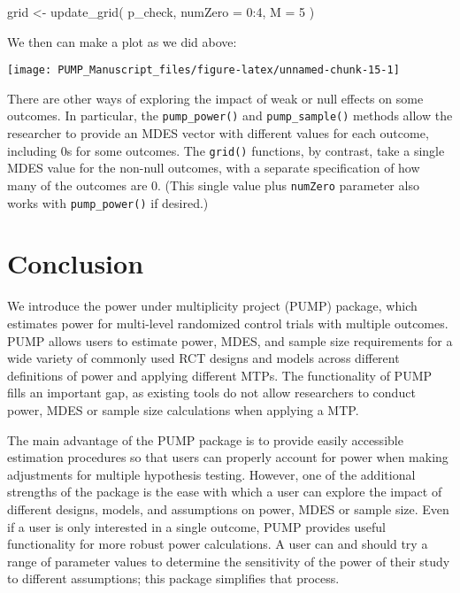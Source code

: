 \documentclass[
]{article}
\newenvironment{Shaded}{\begin{snugshade}}{\end{snugshade}}
\newcommand{\AttributeTok}[1]{\textcolor[rgb]{0.77,0.63,0.00}{#1}}
\newcommand{\DecValTok}[1]{\textcolor[rgb]{0.00,0.00,0.81}{#1}}
\newcommand{\FunctionTok}[1]{\textcolor[rgb]{0.00,0.00,0.00}{#1}}
\newcommand{\NormalTok}[1]{#1}
\newcommand{\OtherTok}[1]{\textcolor[rgb]{0.56,0.35,0.01}{#1}}
\newcommand{\SpecialCharTok}[1]{\textcolor[rgb]{0.00,0.00,0.00}{#1}}
\begin{document}
\begin{Shaded}
\begin{Highlighting}[]
\NormalTok{grid }\OtherTok{\textless{}{-}} \FunctionTok{update\_grid}\NormalTok{( p\_check,}
            \AttributeTok{numZero =} \DecValTok{0}\SpecialCharTok{:}\DecValTok{4}\NormalTok{,}
            \AttributeTok{M =} \DecValTok{5}\NormalTok{ )}
\end{Highlighting}
\end{Shaded}

We then can make a plot as we did above:

\begin{center}\texttt{[image: PUMP\_Manuscript\_files/figure-latex/unnamed-chunk-15-1]} \end{center}

There are other ways of exploring the impact of weak or null effects on
some outcomes. In particular, the \texttt{pump\_power()} and
\texttt{pump\_sample()} methods allow the researcher to provide an MDES
vector with different values for each outcome, including 0s for some
outcomes. The \texttt{grid()} functions, by contrast, take a single MDES
value for the non-null outcomes, with a separate specification of how
many of the outcomes are 0. (This single value plus \texttt{numZero}
parameter also works with \texttt{pump\_power()} if desired.)

\section{Conclusion}
\label{sec:conclusion}

We introduce the power under multiplicity project (PUMP) package, which
estimates power for multi-level randomized control trials with multiple
outcomes. PUMP allows users to estimate power, MDES, and sample size
requirements for a wide variety of commonly used RCT designs and models
across different definitions of power and applying different MTPs. The
functionality of PUMP fills an important gap, as existing tools do not
allow researchers to conduct power, MDES or sample size calculations
when applying a MTP.

The main advantage of the PUMP package is to provide easily accessible
estimation procedures so that users can properly account for power when
making adjustments for multiple hypothesis testing. However, one of the
additional strengths of the package is the ease with which a user can
explore the impact of different designs, models, and assumptions on
power, MDES or sample size. Even if a user is only interested in a
single outcome, PUMP provides useful functionality for more robust power
calculations. A user can and should try a range of parameter values to
determine the sensitivity of the power of their study to different
assumptions; this package simplifies that process.
\end{document}
